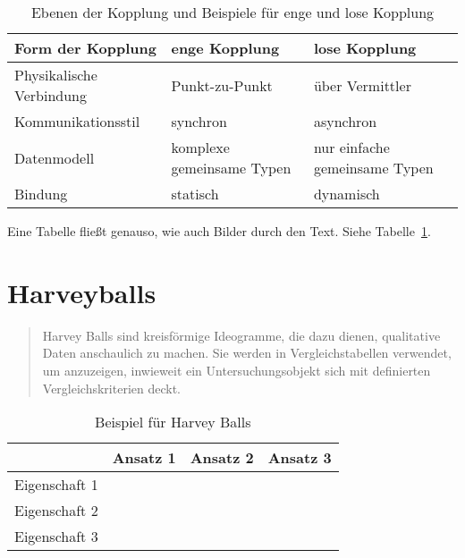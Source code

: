 \begin{table}[h]
  \caption{Ebenen der Kopplung und Beispiele für enge und lose Kopplung}
  \label{Kap2:Kopplungsformen}
  \renewcommand{\arraystretch}{1.2}
  \centering
  \sffamily
  \begin{footnotesize}
    \begin{tabular}{l l l}
    \toprule
    \textbf{Form der Kopplung} & \textbf{enge Kopplung} & \textbf{lose Kopplung}\\
    \midrule
    Physikalische Verbindung	&	Punkt-zu-Punkt	& 	über Vermittler\\
    Kommunikationsstil	&	synchron		&	asynchron\\
    Datenmodell	&	komplexe gemeinsame Typen	&	nur einfache gemeinsame Typen\\
    Bindung	&	statisch		&	dynamisch\\
    \bottomrule
    \end{tabular}
  \end{footnotesize}
  \rmfamily
\end{table}

Eine Tabelle fließt genauso, wie auch Bilder durch den Text. Siehe Tabelle~\ref{Kap2:Kopplungsformen}.


\section{Harveyballs}

\begin{quote}
    Harvey Balls sind kreisförmige Ideogramme, die dazu dienen, qualitative Daten anschaulich zu machen. Sie werden in Vergleichstabellen verwendet, um anzuzeigen, inwieweit ein Untersuchungsobjekt sich mit definierten Vergleichskriterien deckt. \parencite{Wikipedia_HarveyBalls}
\end{quote}

\begin{table}[h]
  \caption{Beispiel für Harvey Balls}
  \label{tab:harveyexample}
  \centering
  \begin{tabular}{lccc}
    \toprule
    & Ansatz 1 & Ansatz 2 & Ansatz 3\\
    \midrule
    Eigenschaft 1	& \harveyBallNone & \harveyBallQuarter & \harveyBallHalf \\
    Eigenschaft 2	& \harveyBallHalf & \harveyBallThreeQuarter & \harveyBallFull \\
    Eigenschaft 3	& \harveyBallFull & \harveyBallThreeQuarter & \harveyBallQuarter\\
    \bottomrule
  \end{tabular}
\end{table}


